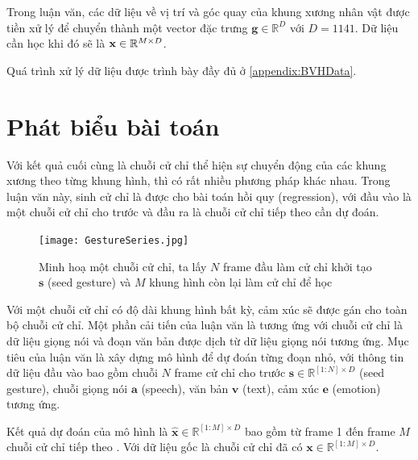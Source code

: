 Trong luận văn, các dữ liệu về vị trí và góc quay của khung xương nhân vật được tiền xử lý để chuyển thành một vector đặc trưng $\mathbf{g} \in \mathbb{R}^{D}$ với $D=1141$. Dữ liệu cần học khi đó sẽ là $\mathbf{x} \in \mathbb{R}^{M \times D}$.

Quá trình xử lý dữ liệu được trình bày đầy đủ ở \autoref{appendix:BVHData}.

\section{Phát biểu bài toán}
\label{sec:ProblemStatement}

Với kết quả cuối cùng là chuỗi cử chỉ thể hiện sự chuyển động của các khung xương theo từng khung hình, thì có rất nhiều phương pháp khác nhau. Trong luận văn này, sinh cử chỉ là  được cho bài toán hồi quy (regression), với đầu vào là một chuỗi cử chỉ cho trước và đầu ra là chuỗi cử chỉ tiếp theo cần dự đoán.

\begin{figure}[H]
	\centering
	\texttt{[image: GestureSeries.jpg]}
	\caption{Minh hoạ một chuỗi cử chỉ, ta lấy $N$ frame đầu làm cử chỉ khởi tạo $\mathbf{s}$ (seed gesture) và $M$ khung hình còn lại làm cử chỉ để học}
	\label{fig:GestureSeries}
\end{figure}

Với một chuỗi cử chỉ có độ dài khung hình bất kỳ, cảm xúc sẽ được gán cho toàn bộ chuỗi cử chỉ. Một phần cải tiến của luận văn là tương ứng với chuỗi cử chỉ là dữ liệu giọng nói và đoạn văn bản được dịch từ dữ liệu giọng nói tương ứng.
Mục tiêu của luận văn là xây dựng mô hình để dự đoán từng đoạn nhỏ, với thông tin dữ liệu đầu vào bao gồm chuỗi $N$ frame cử chỉ cho trước $\mathbf{s} \in \mathbb{R}^{[1:N] \times D}$ (seed gesture), chuỗi giọng nói $\mathbf{a}$ (speech), văn bản $\mathbf{v}$ (text),  cảm xúc $\mathbf{e}$ (emotion) tương ứng.

Kết quả dự đoán của mô hình là $\hat{\mathbf{x}} \in \mathbb{R}^{[1:M] \times D}$ bao gồm từ frame 1 đến frame $M$ chuỗi cử chỉ tiếp theo . Với dữ liệu gốc là chuỗi cử chỉ đã có $\mathbf{x}  \in \mathbb{R}^{[1:M] \times D}$.

